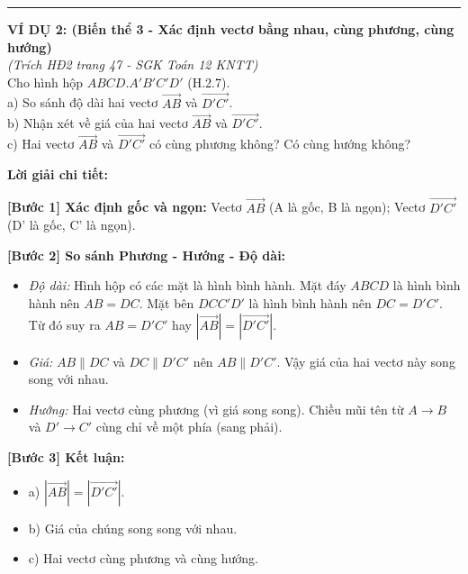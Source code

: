 \documentclass[12pt,a4paper]{article}
\begin{document}
\begin{tcolorbox}[colback=white!95!black, colframe=myred, title=\textbf{KHỐI 4: CÁC VÍ DỤ MINH HỌA MẪU (Phủ hết các biến thể)}]
    \vspace{0.5cm}
    \hrule
    \vspace{0.5cm}

    \textbf{VÍ DỤ 2: (Biến thể 3 - Xác định vectơ bằng nhau, cùng phương, cùng hướng)} \\
    \textit{(Trích HĐ2 trang 47 - SGK Toán 12 KNTT)} \\
    Cho hình hộp \(ABCD.A'B'C'D'\) (H.2.7). \\
    a) So sánh độ dài hai vectơ \(\overrightarrow{AB}\) và \(\overrightarrow{D'C'}\). \\
    b) Nhận xét về giá của hai vectơ \(\overrightarrow{AB}\) và \(\overrightarrow{D'C'}\). \\
    c) Hai vectơ \(\overrightarrow{AB}\) và \(\overrightarrow{D'C'}\) có cùng phương không? Có cùng hướng không?
    
    \vspace{0.2cm}
    \textbf{\textcolor{myblue}{Lời giải chi tiết:}}
    
    \textbf{[Bước 1] Xác định gốc và ngọn:} 
    Vectơ \(\overrightarrow{AB}\) (A là gốc, B là ngọn); Vectơ \(\overrightarrow{D'C'}\) (D' là gốc, C' là ngọn).
    
    \textbf{[Bước 2] So sánh Phương - Hướng - Độ dài:}
    \begin{itemize}[leftmargin=*, label=-]
        \item \textit{Độ dài:} Hình hộp có các mặt là hình bình hành. Mặt đáy \(ABCD\) là hình bình hành nên \(AB = DC\). Mặt bên \(DCC'D'\) là hình bình hành nên \(DC = D'C'\). Từ đó suy ra \(AB = D'C'\) hay \(|\overrightarrow{AB}| = |\overrightarrow{D'C'}|\).
        \item \textit{Giá:} \(AB \parallel DC\) và \(DC \parallel D'C'\) nên \(AB \parallel D'C'\). Vậy giá của hai vectơ này song song với nhau.
        \item \textit{Hướng:} Hai vectơ cùng phương (vì giá song song). Chiều mũi tên từ \(A \to B\) và \(D' \to C'\) cùng chỉ về một phía (sang phải).
    \end{itemize}
    
    \textbf{[Bước 3] Kết luận:}
    \begin{itemize}[leftmargin=*, label=-]
        \item a) \(|\overrightarrow{AB}| = |\overrightarrow{D'C'}|\).
        \item b) Giá của chúng song song với nhau.
        \item c) Hai vectơ cùng phương và cùng hướng.
    \end{itemize}
    

\end{tcolorbox}
\end{document}
